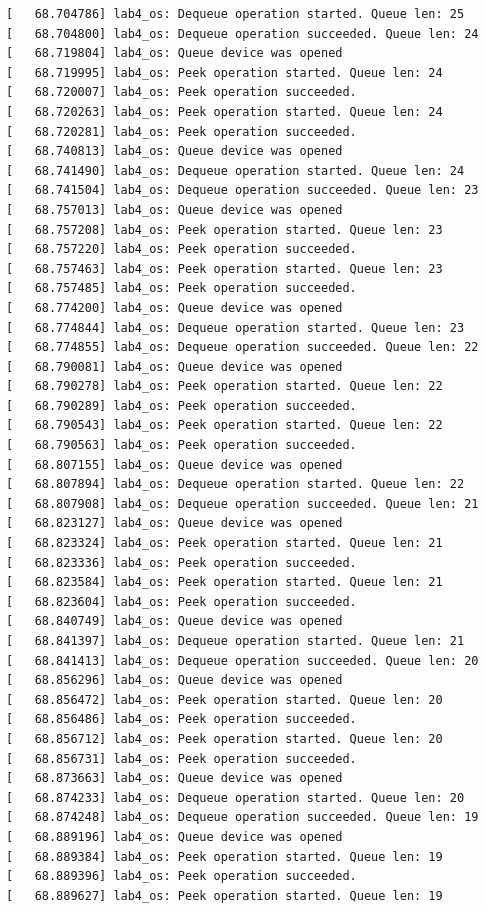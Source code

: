 \documentclass[a4paper,14pt]{extarticle}
\begin{document}
\begin{verbatim}
[   68.704786] lab4_os: Dequeue operation started. Queue len: 25
[   68.704800] lab4_os: Dequeue operation succeeded. Queue len: 24
[   68.719804] lab4_os: Queue device was opened
[   68.719995] lab4_os: Peek operation started. Queue len: 24
[   68.720007] lab4_os: Peek operation succeeded.
[   68.720263] lab4_os: Peek operation started. Queue len: 24
[   68.720281] lab4_os: Peek operation succeeded.
[   68.740813] lab4_os: Queue device was opened
[   68.741490] lab4_os: Dequeue operation started. Queue len: 24
[   68.741504] lab4_os: Dequeue operation succeeded. Queue len: 23
[   68.757013] lab4_os: Queue device was opened
[   68.757208] lab4_os: Peek operation started. Queue len: 23
[   68.757220] lab4_os: Peek operation succeeded.
[   68.757463] lab4_os: Peek operation started. Queue len: 23
[   68.757485] lab4_os: Peek operation succeeded.
[   68.774200] lab4_os: Queue device was opened
[   68.774844] lab4_os: Dequeue operation started. Queue len: 23
[   68.774855] lab4_os: Dequeue operation succeeded. Queue len: 22
[   68.790081] lab4_os: Queue device was opened
[   68.790278] lab4_os: Peek operation started. Queue len: 22
[   68.790289] lab4_os: Peek operation succeeded.
[   68.790543] lab4_os: Peek operation started. Queue len: 22
[   68.790563] lab4_os: Peek operation succeeded.
[   68.807155] lab4_os: Queue device was opened
[   68.807894] lab4_os: Dequeue operation started. Queue len: 22
[   68.807908] lab4_os: Dequeue operation succeeded. Queue len: 21
[   68.823127] lab4_os: Queue device was opened
[   68.823324] lab4_os: Peek operation started. Queue len: 21
[   68.823336] lab4_os: Peek operation succeeded.
[   68.823584] lab4_os: Peek operation started. Queue len: 21
[   68.823604] lab4_os: Peek operation succeeded.
[   68.840749] lab4_os: Queue device was opened
[   68.841397] lab4_os: Dequeue operation started. Queue len: 21
[   68.841413] lab4_os: Dequeue operation succeeded. Queue len: 20
[   68.856296] lab4_os: Queue device was opened
[   68.856472] lab4_os: Peek operation started. Queue len: 20
[   68.856486] lab4_os: Peek operation succeeded.
[   68.856712] lab4_os: Peek operation started. Queue len: 20
[   68.856731] lab4_os: Peek operation succeeded.
[   68.873663] lab4_os: Queue device was opened
[   68.874233] lab4_os: Dequeue operation started. Queue len: 20
[   68.874248] lab4_os: Dequeue operation succeeded. Queue len: 19
[   68.889196] lab4_os: Queue device was opened
[   68.889384] lab4_os: Peek operation started. Queue len: 19
[   68.889396] lab4_os: Peek operation succeeded.
[   68.889627] lab4_os: Peek operation started. Queue len: 19

\end{verbatim}
\end{document}

